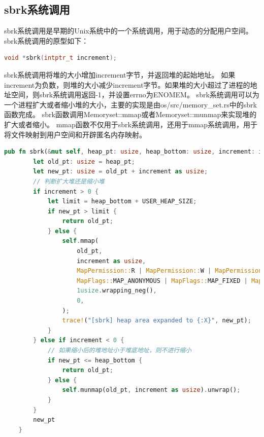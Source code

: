 \subsection{sbrk系统调用}
sbrk系统调用是早期的Unix系统中的一个系统调用，用于动态的分配用户空间。sbrk系统调用的原型如下：
\begin{lstlisting}[language=c]
    void *sbrk(intptr_t increment);
\end{lstlisting}
sbrk系统调用将堆的大小增加increment字节，并返回堆的起始地址。
如果increment为负数，则堆的大小减少increment字节。如果堆的大小超过了进程的地址空间，则sbrk系统调用返回-1，并设置errno为ENOMEM。
sbrk系统调用可以为一个进程扩大或者缩小堆的大小，主要的实现是由os/src/memory_set.rs中的sbrk函数完成。
sbrk函数调用Memoryset::mmap或者Memoryset::munmap来实现堆的扩大或者缩小。
mmap函数不仅用于sbrk系统调用，还用于mmap系统调用，用于将文件映射到用户空间和开辟匿名内存映射。
\begin{lstlisting}[language=rust]
    pub fn sbrk(&mut self, heap_pt: usize, heap_bottom: usize, increment: isize) -> usize {
        let old_pt: usize = heap_pt;
        let new_pt: usize = old_pt + increment as usize;
        // 判断扩大堆还是缩小堆
        if increment > 0 {
            let limit = heap_bottom + USER_HEAP_SIZE;
            if new_pt > limit {
                return old_pt;
            } else {
                self.mmap(
                    old_pt,
                    increment as usize,
                    MapPermission::R | MapPermission::W | MapPermission::U,
                    MapFlags::MAP_ANONYMOUS | MapFlags::MAP_FIXED | MapFlags::MAP_PRIVATE,
                    1usize.wrapping_neg(),
                    0,
                );
                trace!("[sbrk] heap area expanded to {:X}", new_pt);
            }
        } else if increment < 0 {
            // 如果缩小后的堆地址小于堆底地址，则不进行缩小
            if new_pt <= heap_bottom {
                return old_pt;
            } else {
                self.munmap(old_pt, increment as usize).unwrap();
            }
        }
        new_pt
    }
\end{lstlisting}

